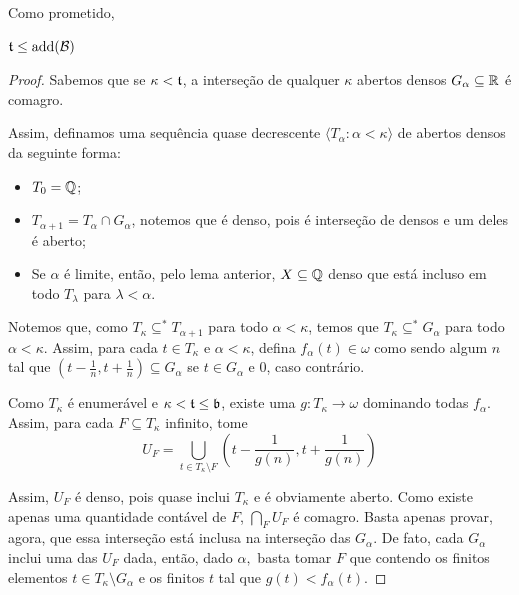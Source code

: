 Como prometido, 

\begin{theorem}
    $\mathfrak{t} \leq \operatorname{add}(\mathcal B)$
\end{theorem}
\begin{proof}
    Sabemos que se $\kappa < \mathfrak{t}$, a interseção de qualquer $\kappa$ abertos densos $G_\alpha \subseteq \mathbb{R}$ é comagro. 

    Assim, definamos uma sequência quase decrescente $\langle T_\alpha : \alpha < \kappa \rangle$ de abertos densos da seguinte forma:

    \begin{itemize}
        \item $T_0 = \mathbb{Q}$;
        \item $T_{\alpha + 1} = T_\alpha\cap G_\alpha$, notemos que é denso, pois é interseção de densos e um deles é aberto;
        \item Se $\alpha$ é limite, então, pelo lema anterior, $X\subseteq \mathbb{Q}$ denso que está incluso em todo $T_\lambda$ para $\lambda < \alpha$.
    \end{itemize}

    Notemos que, como $T_\kappa \subseteq^* T_{\alpha + 1}$ para todo $\alpha < \kappa$, temos que $T_\kappa \subseteq^* G_\alpha$ para todo $\alpha < \kappa$. Assim, para cada $t\in T_\kappa$ e $\alpha < \kappa$, defina $f_\alpha(t) \in \omega$ como sendo algum $n$ tal que $\left(t-\frac{1}{n}, t+\frac{1}{n}\right) \subseteq G_\alpha$ se $t\in G_\alpha$ e $0$, caso contrário.

    Como $T_\kappa$ é enumerável e $\kappa < \mathfrak{t} \leq \mathfrak{b}$, existe uma $g:T_\kappa \to \omega$ dominando todas $f_\alpha$. Assim, para cada $F\subseteq T_\kappa$ infinito, tome 
    $$
        U_F = \bigcup_{t\in T_\kappa\setminus F}\left(t- \frac{1}{g(n)}, t +\frac{1}{g(n)}\right)
    $$
    
    Assim, $U_F$ é denso, pois quase inclui $T_\kappa$ e é obviamente aberto. Como existe apenas uma quantidade contável de $F$, $\bigcap_F U_F$ é comagro. Basta apenas provar, agora, que essa interseção está inclusa na interseção das $G_\alpha$. De fato, cada $G_\alpha$ inclui uma das $U_F$ dada, então, dado $\alpha,$ basta tomar $F$ que contendo os finitos elementos $t\in T_\kappa\setminus G_\alpha$ e os finitos $t$ tal que $g(t) < f_\alpha(t)$.
\end{proof}